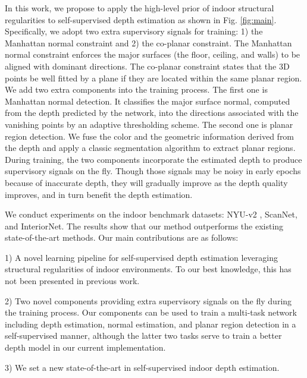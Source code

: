 \documentclass[10pt,twocolumn,letterpaper]{article}
\newcommand{\Fig}[1]{Fig. \ref{#1}}
\begin{document}
In this work, we propose to apply the high-level prior of indoor structural regularities to self-supervised depth estimation as shown in \Fig{fig:main}. Specifically, we adopt two extra supervisory signals for training: 1) the Manhattan normal constraint and 2) the co-planar constraint. The Manhattan normal constraint enforces the major surfaces (the floor, ceiling, and walls) to be aligned with dominant directions. The co-planar constraint states that the 3D points be well fitted by a plane if they are located within the same planar region.	We add two extra components into the training process. The first one is Manhattan normal detection. It classifies the major surface normal, computed from the depth predicted by the network, into the directions associated with the vanishing points by an adaptive thresholding scheme. The second one is planar region detection. We fuse the color and the geometric information derived from the depth and apply a classic segmentation algorithm to extract planar regions. 
During training, the two components incorporate the estimated depth to produce supervisory signals on the fly. Though those signals may be noisy in early epochs because of inaccurate depth, they will gradually improve as the depth quality improves, and in turn benefit the depth estimation.

We conduct experiments on the indoor benchmark datasets: NYU-v2 \cite{silberman2012indoor}, ScanNet\cite{dai2017scannet}, and InteriorNet\cite{li2018interiornet}. The results show that our method outperforms the existing state-of-the-art methods. Our main contributions are as follows: 

1) A novel learning pipeline for self-supervised depth estimation leveraging structural regularities of indoor environments. To our best knowledge, this has not been presented in previous work.

2) Two novel components providing extra supervisory signals on the fly during the training process. Our components can be used to train a multi-task network including depth estimation, normal estimation, and planar region detection in a self-supervised manner, although the latter two tasks serve to train a better depth model in our current implementation. 

3) We set a new state-of-the-art in self-supervised indoor depth estimation.
\end{document}
